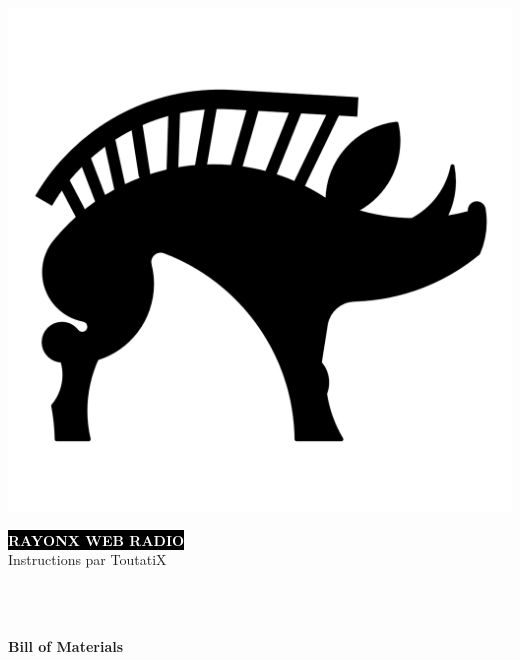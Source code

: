 \documentclass[9pt]{developercv}
\begin{document}
\setlength{\tabcolsep}{16pt}
\renewcommand{\arraystretch}{1.5}

\begin{center}
	\includegraphics[scale=0.06]{./src/tex/Logo.png}
\end{center}
\begin{minipage}[t]{0.48\textwidth}
	\vspace{-\baselineskip}
	\colorbox{black}{{\HUGE\textcolor{white}{\textbf{\MakeUppercase{RayonX web radio}}}}}\\
	\vspace{6pt}
	\huge Instructions par ToutatiX
\end{minipage}
\begin{minipage}[t]{0.275\textwidth}
	\vspace{-\baselineskip}
	\hspace{1cm}
	\end{minipage}
\begin{minipage}[t]{0.275\textwidth}
	\vspace{-\baselineskip}
	\\
	\\	
\end{minipage}

\vspace{5mm}
\begin{center}
	\huge \textbf{Bill of Materials}
\end{center}
\end{document}
